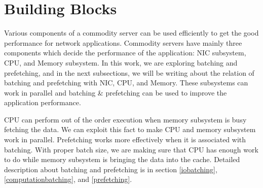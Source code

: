 \section{Building Blocks}
\label{Buildingblocks}
Various components of a commodity server can be used efficiently to get the good performance for network applications. Commodity servers have mainly three components which decide the performance of the application: NIC subsystem, CPU, and Memory subsystem. In this work, we are exploring batching and prefetching, and in the next subsections, we will be writing about the relation of batching and prefetching with NIC, CPU, and Memory. These subsystems can work in parallel and batching \& prefetching can be used to improve the application performance.

CPU can perform out of the order execution when memory subsystem is busy fetching the data. We can exploit this fact to make CPU and memory subsystem work in parallel. Prefetching works more effectively when it is associated with batching. With proper batch size, we are making sure that CPU has enough work to do while memory subsystem is bringing the data into the cache. Detailed description about batching and prefetching is in section \ref{iobatching}, \ref{computationbatching}, and \ref{prefetching}.

